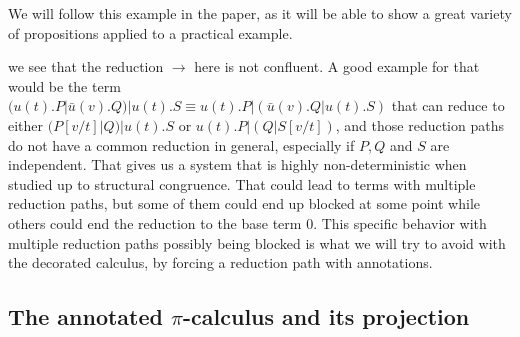 We will follow this example in the paper, as it will be able to show a great variety of propositions applied to a practical example.

\remark we see that the reduction $\to$ here is not confluent. A good example for that would be the term\\
$(u(t).P|\bar{u}(v).Q)|u(t).S \equiv u(t).P|(\bar{u}(v).Q|u(t).S)$ that can reduce to either $(P[v/t]|Q)|u(t).S$ or $u(t).P|(Q|S[v/t])$, and those reduction paths do not have a common reduction in general, especially if $P,Q$ and $S$ are independent. That gives us a system that is highly non-deterministic when studied up to structural congruence. That could lead to terms with multiple reduction paths, but some of them could end up blocked at some point while others could end the reduction to the base term 0. This specific behavior with multiple reduction paths possibly being blocked is what we will try to avoid with the decorated calculus, by forcing a reduction path with annotations.

\subsection{The annotated $\pi$-calculus and its projection}

